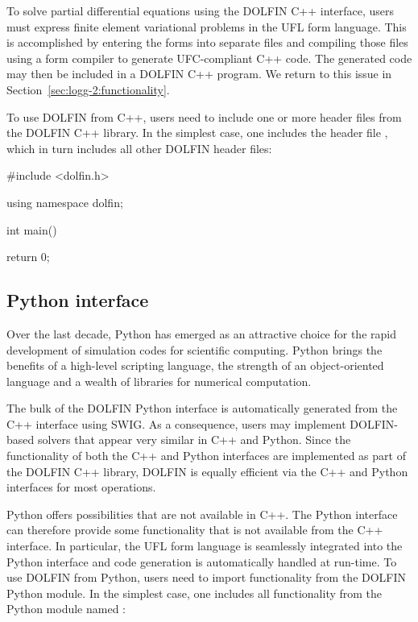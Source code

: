 To solve partial differential equations using the DOLFIN C++
interface, users must express finite element variational problems
in the UFL form language. This is accomplished by entering the forms
into separate  files and compiling those files using a form
compiler to generate UFC-compliant C++ code. The generated code may
then be included in a DOLFIN C++ program. We return to this issue in
Section~\ref{sec:logg-2:functionality}.

To use DOLFIN from C++, users need to include one or more header files
from the DOLFIN C++ library. In the simplest case, one includes the
header file , which in turn includes all other DOLFIN
header files:

\begin{c++}
#include <dolfin.h>

using namespace dolfin;

int main()
{

  return 0;
}
\end{c++}

\subsection{Python interface}

Over the last decade, Python has emerged as an attractive choice for
the rapid development of simulation codes for scientific computing.
Python brings the benefits of a high-level scripting language, the
strength of an object-oriented language and a wealth of libraries for
numerical computation.

The bulk of the DOLFIN Python interface is automatically generated from
the C++ interface using SWIG. As a consequence, users may implement
DOLFIN-based solvers that appear very similar in C++ and Python. Since
the functionality of both the C++ and Python interfaces are implemented
as part of the DOLFIN C++ library, DOLFIN is equally efficient via the
C++ and Python interfaces for most operations.

Python offers possibilities that are not available in C++. The Python
interface can therefore provide some functionality that is not available
from the C++ interface. In particular, the UFL form language is seamlessly
integrated into the Python interface and code generation is automatically
handled at run-time.  To use DOLFIN from Python, users need to import
functionality from the DOLFIN Python module. In the simplest case,
one includes all functionality from the Python module named :

